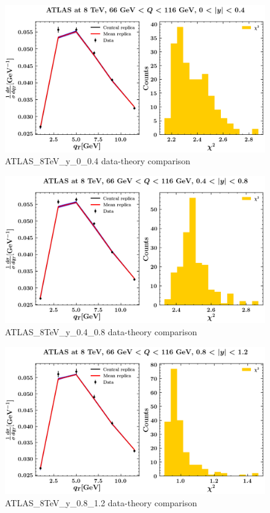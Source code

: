 \documentclass[
]{article}
\begin{document}
\begin{figure}
\centering
\includegraphics{pngplots/ATLAS_8TeV_y_0_0.4.png}
\caption{ATLAS\_8TeV\_y\_0\_0.4 data-theory comparison}
\end{figure}

\begin{figure}
\centering
\includegraphics{pngplots/ATLAS_8TeV_y_0.4_0.8.png}
\caption{ATLAS\_8TeV\_y\_0.4\_0.8 data-theory comparison}
\end{figure}

\begin{figure}
\centering
\includegraphics{pngplots/ATLAS_8TeV_y_0.8_1.2.png}
\caption{ATLAS\_8TeV\_y\_0.8\_1.2 data-theory comparison}
\end{figure}
\end{document}

